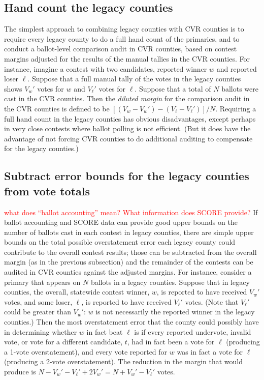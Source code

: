 \documentclass[12pt]{article}
\newcommand{\note}[1]{\textcolor{red}{\sc #1}}
\begin{document}
\subsection{Hand count the legacy counties}
The simplest approach to combining legacy counties with CVR counties is to require every
legacy county to do a full hand count of the primaries, and to conduct a 
ballot-level comparison audit in CVR counties, based on contest margins adjusted for
the results of the manual tallies in the CVR counties.
For instance, imagine a contest with two candidates, reported winner $w$ and reported loser $\ell$.
Suppose that a full manual tally of the votes in the legacy counties shows $V_w'$ votes for $w$ and
$V_\ell'$ votes for $\ell$.
Suppose that a total of $N$ ballots were cast in the CVR counties.
Then the \emph{diluted margin}  for the comparison audit in the CVR counties is defined to be
$[(V_w-V_w')-(V_\ell-V_\ell')]/N$.
Requiring a full hand count in the legacy counties has obvious disadvantages, except perhaps in very 
close contests where ballot polling is not efficient. (But it does have the advantage of not forcing CVR 
counties to do additional auditing to compensate for the legacy counties.)

\subsection{Subtract error bounds for the legacy counties from vote totals}
\note{what does ``ballot accounting'' mean? What information does SCORE provide?}
If ballot accounting and SCORE data can provide good upper bounds on the number of ballots cast in
each contest in legacy counties, there are simple upper bounds on the total
possible overstatement error each legacy county could contribute to the overall contest
results; those can be subtracted from the overall margin (as in the previous subsection) and the
remainder of the contests can be audited in CVR counties against the adjusted margins.
For instance, consider a primary that appears on $N$ ballots in a legacy counties.
Suppose that in legacy counties, the overall, statewide contest winner, $w$, is reported to have received $V_w'$ votes, and some loser, $\ell$, is reported to have received $V_\ell'$ votes. 
(Note that $V_\ell'$ could be greater than $V_w'$: $w$ is not necessarily the reported winner in the legacy counties.)
Then the most overstatement error that the county could possibly have in determining whether
$w$ in fact beat $\ell$ is if every reported undervote, invalid vote, or vote for a different candidate, $t$, had 
in fact been a vote for $\ell$ (producing a 1-vote overstatement), and every vote reported for 
$w$ was in fact a vote for $\ell$ (producing a 2-vote overstatement).
The reduction in the margin that would produce is 
$N - V_w' - V_\ell' + 2V_w' = N + V_w' - V_\ell'$ votes.
\end{document}
